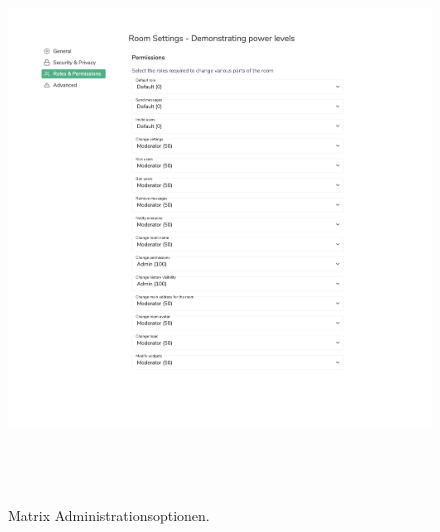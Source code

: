 \begin{figure}[htb]
    \centering
    \includegraphics[height=15cm]{graphics/moderation3.png}
    \caption[Matrix Administrationsoptionen]{Matrix Administrationsoptionen.\footnotemark}
    \label{abb:UI}
\end{figure}
